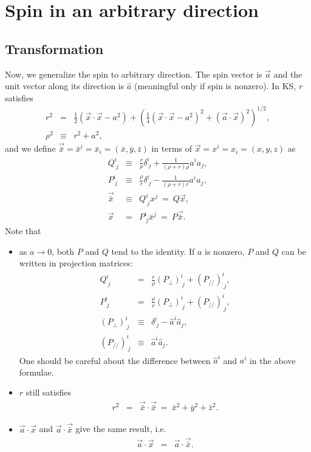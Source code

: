 \documentclass{article}
\begin{document}
\section{Spin in an arbitrary direction}
\subsection{Transformation}
Now, we generalize the spin to arbitrary direction. The spin vector is $\vec{a}$ and the unit vector along its direction is $\hat{a}$ (meaningful only if spin is nonzero). In KS, $r$ satisfies
\begin{eqnarray}
	r^2 &=& \frac{1}{2}(\vec{x}\cdot \vec{x} - a^2) 
	+ \left(\frac{1}{4}(\vec{x}\cdot \vec{x} - a^2)^2 + (\vec{a}\cdot \vec{x})^2\right)^{1/2}, \\
	\rho^2 &\equiv& r^2+a^2,
\end{eqnarray}
and we define $\vec{\bar{x}} = \bar{x}^i = \bar{x}_i = (\bar{x},\bar{y},\bar{z})$ in terms of $\vec{x} = x^i = x_i = (x,y,z)$ as
\begin{eqnarray}
	Q^i_{\ j} &\equiv& \frac{r}{\rho}\delta^i_{\ j}+\frac{1}{(\rho+r)\rho}a^ia_j, \\
	P^i_{\ j} &\equiv& \frac{\rho}{r}\delta^i_{\ j}-\frac{1}{(\rho+r)r}a^ia_j, \\
	\vec{\bar{x}} &\equiv& Q^i_{\ j}x^j \ =\  Q\vec{x}, \\
	\vec{x} &=& P^i_{\ j}\bar{x}^j \ =\  P\vec{\bar{x}}.
\end{eqnarray}
Note that 
\begin{itemize}
	\item as $a\rightarrow0$, both $P$ and $Q$ tend to the identity. If $a$ is nonzero, $P$ and $Q$ can be written in projection matrices:
\begin{eqnarray}
	Q^i_{\ j} &=& \frac{r}{\rho}(P_\perp)^i_{\ j}+(P_{//})^i_{\ j}, \\
	P^i_{\ j} &=& \frac{\rho}{r}(P_\perp)^i_{\ j}+(P_{//})^i_{\ j}, \\
	(P_\perp)^i_{\ j} &\equiv& \delta^i_{\ j}-\hat{a}^i\hat{a}_j, \\
	(P_{//})^i_{\ j} &\equiv& \hat{a}^i\hat{a}_j.
\end{eqnarray}
One should be careful about the difference between $\hat{a}^i$ and $a^i$ in the above formulae. 
	\item $r$ still satisfies
\begin{eqnarray}
	r^2 &=& \vec{\bar{x}}\cdot \vec{\bar{x}} \ =\  \bar{x}^2+\bar{y}^2+\bar{z}^2.
\end{eqnarray}
	\item $\vec{a}\cdot\vec{x}$ and $\vec{a}\cdot\vec{\bar{x}}$ give the same result, i.e. 
\begin{eqnarray}
	\vec{a}\cdot\vec{x} &=& \vec{a}\cdot\vec{\bar{x}}.
\end{eqnarray}
\end{itemize}
\end{document}
